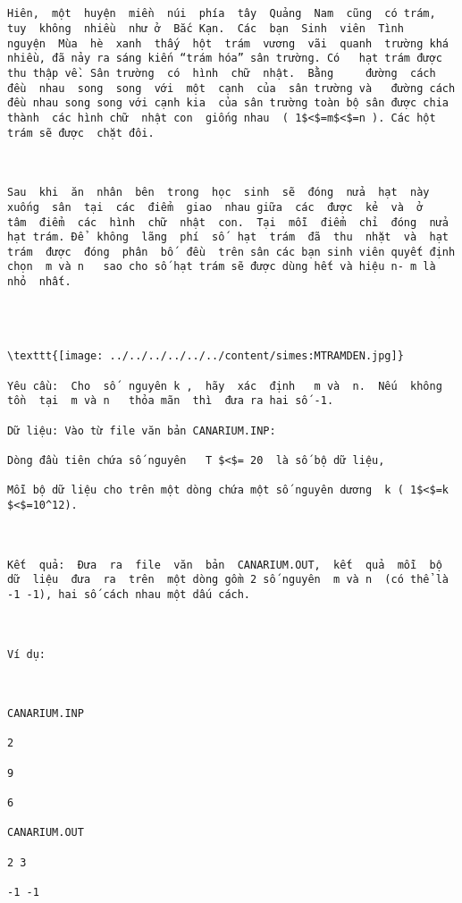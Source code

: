 
\begin{verbatim}


Hiên,  một  huyện  miền  núi  phía  tây  Quảng  Nam  cũng  có trám,  tuy  không  nhiều  như ở  Bắc Kạn.  Các  bạn  Sinh  viên  Tình  nguyện  Mùa  hè  xanh  thấy  hột  trám  vương  vãi  quanh  trường khá nhiều, đã nảy ra sáng kiến “trám hóa” sân trường. Có   hạt trám được thu thập về. Sân trường  có  hình  chữ  nhật.  Bằng     đường  cách  đều  nhau  song  song  với  một  cạnh  của  sân trường và   đường cách đều nhau song song với cạnh kia  của sân trường toàn bộ sân được chia thành  các hình chữ  nhật con  giống nhau  ( 1$<$=m$<$=n ). Các hột trám sẽ được  chặt đôi.

 

Sau  khi  ăn  nhân  bên  trong  học  sinh  sẽ  đóng  nửa  hạt  này  xuống  sân  tại  các  điểm  giao  nhau giữa  các  được  kẻ  và  ở  tâm  điểm  các  hình  chữ  nhật  con.  Tại  mỗi  điểm  chỉ  đóng  nửa  hạt trám. Để  không  lãng  phí  số  hạt  trám  đã  thu  nhặt  và  hạt  trám  được  đóng  phân  bố  đều  trên sân các bạn sinh viên quyết định chọn  m và n   sao cho số hạt trám sẽ được dùng hết và hiệu n- m là nhỏ  nhất.

 


\texttt{[image: ../../../../../../content/simes:MTRAMDEN.jpg]}

Yêu cầu:  Cho  số  nguyên k ,  hãy  xác  định   m và  n.  Nếu  không  tồn  tại  m và n   thỏa mãn  thì  đưa ra hai số -1.

Dữ liệu: Vào từ file văn bản CANARIUM.INP:

Dòng đầu tiên chứa số nguyên   T $<$= 20  là số bộ dữ liệu,

Mỗi bộ dữ liệu cho trên một dòng chứa một số nguyên dương  k ( 1$<$=k $<$=10^12).

 

Kết  quả:  Đưa  ra  file  văn  bản  CANARIUM.OUT,  kết  quả  mỗi  bộ  dữ  liệu  đưa  ra  trên  một dòng gồm 2 số nguyên  m và n  (có thể là -1 -1), hai số cách nhau một dấu cách.

 

Ví dụ:

 

CANARIUM.INP 

2

9

6

CANARIUM.OUT

2 3

-1 -1\end{verbatim}